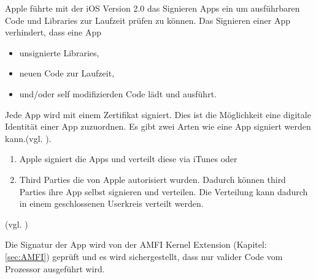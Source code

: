 Apple führte mit der iOS Version 2.0 das Signieren Apps ein um ausführbaren Code und Libraries zur Laufzeit prüfen zu können. Das Signieren einer App verhindert, dass eine App 
\begin{itemize}
    \item unsignierte Libraries,
    \item neuen Code zur Laufzeit, 
    \item und/oder self modifizierden Code lädt und ausführt.
\end{itemize}
Jede App wird mit einem Zertifikat signiert. Dies ist die Möglichkeit eine digitale Identität einer App zuzuordnen. Es gibt zwei Arten wie eine App signiert werden kann.(vgl. \cite{Cert[2], Cert[3]}). \newline
\begin{enumerate}
    \item Apple signiert die Apps und verteilt diese via iTunes oder
    \item Third Parties die von Apple autorisiert wurden. Dadurch können third Parties ihre App selbst signieren und verteilen. Die Verteilung kann dadurch in einem geschlossenen Userkreis verteilt werden.
\end{enumerate} 
(vgl. \cite{Sign[1], Sign[2], Sign[3], Sign[4], Sign[5], ROP[1]}) \par 
Die Signatur der App wird von der AMFI Kernel Extension (Kapitel: \ref{sec:AMFI}) geprüft und es wird sichergestellt, dass nur valider Code vom Prozessor ausgeführt wird.    
 
